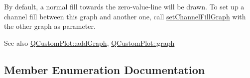 By default, a normal fill towards the zero-\/value-\/line will be drawn. To set up a channel fill between this graph and another one, call \hyperlink{class_q_c_p_graph_a2d03156df1b64037a2e36cfa50351ca3}{set\+Channel\+Fill\+Graph} with the other graph as parameter.

\begin{DoxySeeAlso}{See also}
\hyperlink{class_q_custom_plot_a6fb2873d35a8a8089842d81a70a54167}{Q\+Custom\+Plot\+::add\+Graph}, \hyperlink{class_q_custom_plot_a6d3ed93c2bf46ab7fa670d66be4cddaf}{Q\+Custom\+Plot\+::graph} 
\end{DoxySeeAlso}


\subsection{Member Enumeration Documentation}

